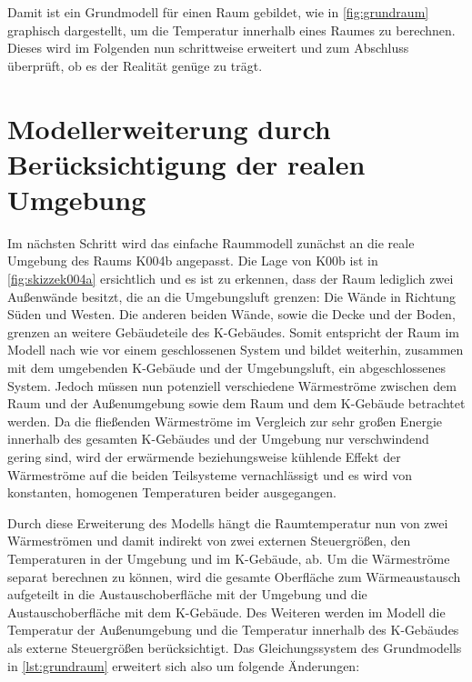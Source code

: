 Damit ist ein Grundmodell für einen Raum gebildet, wie in \ref{fig:grundraum} graphisch dargestellt, um die Temperatur innerhalb eines Raumes zu berechnen. Dieses wird im Folgenden nun schrittweise erweitert und zum Abschluss überprüft, ob es der Realität genüge zu trägt.


\section{Modellerweiterung durch Berücksichtigung der realen Umgebung}

Im nächsten Schritt wird das einfache Raummodell zunächst an die reale Umgebung des Raums K004b angepasst. Die Lage von K00b ist in \ref{fig:skizzek004a} ersichtlich und es ist zu erkennen, dass der Raum lediglich zwei Außenwände besitzt, die an die Umgebungsluft grenzen: Die Wände in Richtung Süden und Westen. Die anderen beiden Wände, sowie die Decke und der Boden, grenzen an weitere Gebäudeteile des K-Gebäudes. Somit entspricht der Raum im Modell nach wie vor einem geschlossenen System und bildet weiterhin, zusammen mit dem umgebenden K-Gebäude und der Umgebungsluft, ein abgeschlossenes System. Jedoch müssen nun potenziell verschiedene Wärmeströme zwischen dem Raum und der Außenumgebung sowie dem Raum und dem K-Gebäude betrachtet werden. Da die fließenden Wärmeströme im Vergleich zur sehr großen Energie innerhalb des gesamten K-Gebäudes und der Umgebung nur verschwindend gering sind, wird der erwärmende beziehungsweise kühlende Effekt der Wärmeströme auf die beiden Teilsysteme vernachlässigt und es wird von konstanten, homogenen Temperaturen beider ausgegangen.

Durch diese Erweiterung des Modells hängt die Raumtemperatur nun von zwei Wärmeströmen und damit indirekt von zwei externen Steuergrößen, den Temperaturen in der Umgebung und im K-Gebäude, ab. Um die Wärmeströme separat berechnen zu können, wird die gesamte Oberfläche zum Wärmeaustausch aufgeteilt in die Austauschoberfläche mit der Umgebung und die Austauschoberfläche mit dem K-Gebäude. Des Weiteren werden im Modell die Temperatur der Außenumgebung und die Temperatur innerhalb des K-Gebäudes als externe Steuergrößen berücksichtigt. Das Gleichungssystem des Grundmodells in \ref{lst:grundraum} erweitert sich also um folgende Änderungen:

